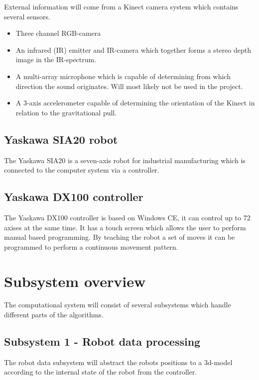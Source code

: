 \documentclass[10pt,a4paper,twocolumn,english]{article}
\begin{document}
External information will come from a Kinect camera system which contains several sensors.\cite{kinectref}

\begin{itemize}
\item Three channel RGB-camera
\item An infrared (IR) emitter and IR-camera which together forms a stereo depth image in the IR-spectrum.
\item A multi-array microphone which is capable of determining from which direction the sound originates. Will most likely not be used in the project.
\item A 3-axis accelerometer capable of determining the orientation of the Kinect in relation to the gravitational pull.
\end{itemize}

\subsection{Yaskawa SIA20 robot}

The Yaskawa SIA20 is a seven-axis robot for industrial manufacturing which is connected to the computer system via a controller.\cite{sia20}

\subsection{Yaskawa DX100 controller}

The Yaskawa DX100 controller is based on Windows CE, it can control up to 72 axises at the same time. It has a touch screen which allows the user to perform manual based programming. By teaching the robot a set of moves it can be programmed to perform a continuous movement pattern.

\section{Subsystem overview}

The computational system will consist of several subsystems which handle different parts of the algorithms.

\subsection{Subsystem 1 - Robot data processing}

The robot data subsystem will abstract the robots positions to a 3d-model according to the internal state of the robot from the controller.
\end{document}
